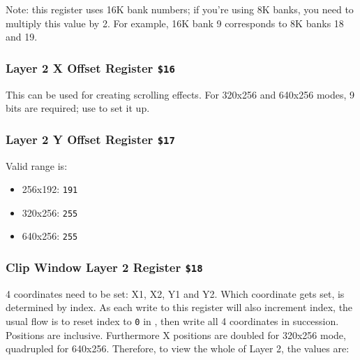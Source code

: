 \documentclass[12pt,twoside,openright,a4paper]{book}
\begin{document}
Note: this register uses 16K bank numbers; if you're using 8K banks, you need to multiply this value by 2. For example, 16K bank 9 corresponds to 8K banks 18 and 19.


\pagebreak
\subsubsection{Layer 2 X Offset Register {\tt \$16}}

\begin{NextPort}
\end{NextPort}

This can be used for creating scrolling effects. For 320x256 and 640x256 modes, 9 bits are required; use  to set it up.


\subsubsection{Layer 2 Y Offset Register {\tt \$17}}

\begin{NextPort}
\end{NextPort}

Valid range is:

\begin{itemize}[topsep=1pt,itemsep=1pt]
	\item 256x192: {\tt 191}
	\item 320x256: {\tt 255}
	\item 640x256: {\tt 255}
\end{itemize}


\subsubsection{Clip Window Layer 2 Register {\tt \$18}}

\begin{NextPort}
\end{NextPort}

4 coordinates need to be set: X1, X2, Y1 and Y2. Which coordinate gets set, is determined by index. As each write to this register will also increment index, the usual flow is to reset index to {\tt 0} in , then write all 4 coordinates in succession. Positions are inclusive. Furthermore X positions are doubled for 320x256 mode, quadrupled for 640x256. Therefore, to view the whole of Layer 2, the values are:
\end{document}
